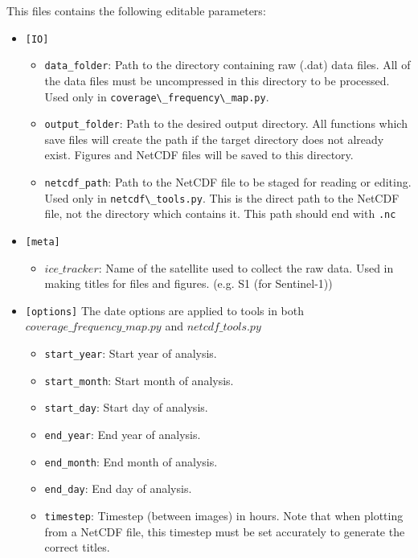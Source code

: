 \documentclass{article}
\begin{document}
            This files contains the following editable parameters:
            \begin{itemize}
                \item{} \verb?[IO]?
                \begin{itemize}
                    \item \verb?data_folder?: Path to the directory containing raw (.dat) data files. All of the data files must be uncompressed in this directory to be processed. Used only in \verb?coverage\_frequency\_map.py?.
                    \item \verb?output_folder?: Path to the desired output directory. All functions which save files will create the path if the target directory does not already exist. Figures and NetCDF files will be saved to this directory.
                    \item \verb?netcdf_path?: Path to the NetCDF file to be staged for reading or editing. Used only in \verb?netcdf\_tools.py?. This is the direct path to the NetCDF file, not the directory which contains it. This path should end with \verb?.nc?
                \end{itemize}
                \item{} \verb?[meta]?
                \begin{itemize}
                    \item $ice\_tracker$: Name of the satellite used to collect the raw data. Used in making titles for files and figures. (e.g. S1 (for Sentinel-1))
                \end{itemize}
                \item{} \verb?[options]?
                The date options are applied to tools in both $coverage\_frequency\_map.py$ and $netcdf\_tools.py$
                \begin{itemize}
                    \item \verb?start_year?: Start year of analysis.
                    \item \verb?start_month?: Start month of analysis.
                    \item \verb?start_day?: Start day of analysis.
                    \item \verb?end_year?: End year of analysis.
                    \item \verb?end_month?: End month of analysis.
                    \item \verb?end_day?: End day of analysis.
                    \item \verb?timestep?: Timestep (between images) in hours. Note that when plotting from a NetCDF file, this timestep must be set accurately to generate the correct titles.

\end{itemize}
\end{itemize}
\end{document}
